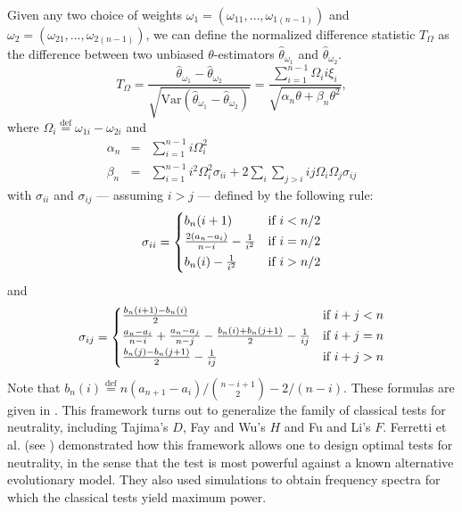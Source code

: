 \documentclass[lettersize, 10pt]{article}
\begin{document}
Given any two choice of weights $\omega_1 = (\omega_{11},\ldots,\omega_{1(n-1)})$ and $\omega_2 = (\omega_{21},\ldots,\omega_{2(n-1)})$, we can define the normalized difference statistic $T_\Omega$ as the difference between two unbiased $\theta$-estimators $\hat{\theta}_{\omega_1}$ and $\hat{\theta}_{\omega_2}$.
\begin{equation}
T_\Omega=\frac{\hat{\theta}_{\omega_1}-\hat{\theta}_{\omega_2}}{\sqrt{\text{Var}\left(\hat{\theta}_{\omega_1}-\hat{\theta}_{\omega_2}\right)}} = \frac{\sum_{i=1}^{n-1}\Omega_i i\xi_i}{\sqrt{\alpha_n\theta+\beta_n\theta^2}}, \label{achaz2009-2}
\end{equation}
where $\Omega_i\overset{\text{def}}{=}\omega_{1i} - \omega_{2i}$ and 
\begin{eqnarray*}
\alpha_n & = & \sum_{i=1}^{n-1} i\Omega_i^2 \\
\beta_n & = & \sum_{i=1}^{n-1} i^2\Omega_i^2\sigma_{ii} + 2\sum_{i}\sum_{j>i} ij\Omega_i\Omega_j\sigma_{ij}
\end{eqnarray*}
with $\sigma_{ii}$ and $\sigma_{ij}$ --- assuming $i>j$ --- defined by the following rule: 
\begin{equation*}
\sigma_{ii} = \begin{cases} \vspace{2pt}
b_n(i+1) & \text{if}~i<n/2 \\ \vspace{2pt}
\frac{2(a_n-a_i)}{n-i} - \frac{1}{i^2} & \text{if}~i=n/2 \\ \vspace{2pt}
b_n(i) - \frac{1}{i^2} & \text{if}~i>n/2
\end{cases}
\end{equation*}
and
\begin{equation*}
\sigma_{ij} = \begin{cases} \vspace{2pt}
\frac{b_n(i+1) - b_n(i)}{2} & \text{if}~i+j<n \\ \vspace{2pt}
\frac{a_n-a_i}{n-i} + \frac{a_n-a_j}{n-j} - \frac{b_n(i)+b_n(j+1)}{2} - \frac{1}{ij} & \text{if}~i+j=n \\ \vspace{2pt}
\frac{b_n(j)-b_n(j+1)}{2} - \frac{1}{ij} & \text{if}~i+j>n
\end{cases}
\end{equation*}
Note that $b_n(i) \overset{\text{def}}{=}n(a_{n+1}-a_i)\big/ {n-i+1\choose 2} - 2/(n-i)$. These formulas are given in \citep[pg.~251]{Achaz2009}. This framework turns out to generalize the family of classical tests for neutrality, including Tajima's $D$, Fay and Wu's $H$ and Fu and Li's $F$. Ferretti et al. (see \cite{Ferretti2010}) demonstrated how this framework allows one to design optimal tests for neutrality, in the sense that the test is most powerful against a known alternative evolutionary model. They also used simulations to obtain frequency spectra for which the classical tests yield maximum power.
\end{document}

